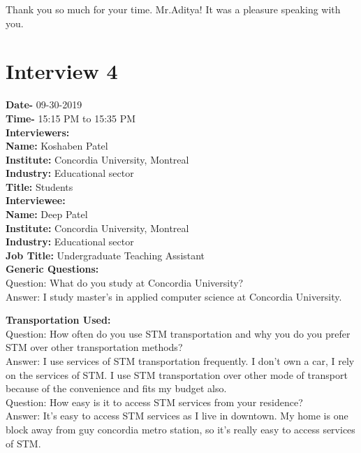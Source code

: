 \documentclass[11pt, english]{report}
\begin{document}
Thank you so much for your time. Mr.Aditya! It was a pleasure speaking with you. \\


\section{Interview 4}
\textbf{Date-} 09-30-2019\\
\textbf{Time-} 15:15 PM to 15:35 PM\\
\textbf{Interviewers:}\\

\textbf{Name:} Koshaben Patel \\
\textbf{Institute:} Concordia University, Montreal \\
\textbf{Industry:} Educational sector\\
\textbf{Title:} Students \\ 

\textbf{Interviewee:}\\

\textbf{Name:} Deep Patel \\
\textbf{Institute:} Concordia University, Montreal \\
\textbf{Industry:} Educational sector\\
\textbf{Job Title:} Undergraduate Teaching Assistant\\ 


\textbf{Generic Questions:}\\

Question: What do you study at Concordia University? \\
Answer: I study master's in applied computer science at Concordia University.

\textbf{Transportation Used:}\\

Question: How often do you use STM transportation and why you do you prefer STM over other transportation methods?\\
Answer: I use services of STM transportation frequently. I don't own a car, I rely on the services of STM. I use STM transportation over other mode of transport because of the convenience and fits my budget also.\\

Question: How easy is it to access STM services from your residence?\\
Answer: It's easy to access STM services as I live in downtown. My home is one block away from guy concordia metro station, so it's really easy to access services of STM.\\
\end{document}
